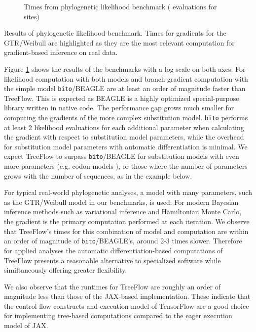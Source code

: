 \begin{figure}
    \centering
    \caption{Times from phylogenetic likelihood benchmark ( evaluations for  sites)}
    \label{fig:benchmark}
\end{figure}

\begin{table}
    \centering
    \caption{Results of phylogenetic likelihood benchmark. Times for gradients for the GTR/Weibull are highlighted as they are the most relevant computation for gradient-based inference on real data.}
    \label{tab:benchmarkfit}
\end{table}

Figure \ref{fig:benchmark} shows the results of the benchmarks with a log scale on both axes. For likelihood computation with both models and branch gradient computation with the simple model \texttt{bito}/BEAGLE are at least an order of magnitude faster than TreeFlow. This is expected as BEAGLE is a highly optimized special-purpose library written in native code. The performance gap grows much smaller for computing the gradients of the more complex substitution model. \texttt{bito} performs at least 2 likelihood evaluations for each additional parameter when calculating the gradient with respect to substitution model parameters, while the overhead for substitution model parameters with automatic differentiation is minimal. We expect TreeFlow to surpass \texttt{bito}/BEAGLE for substitution models with even more parameters (e.g. codon models \cite{goldman1994codon}), or those where the number of parameters grows with the number of sequences, as in the example below.

For typical real-world phylogenetic analyses, a model with many parameters, such as the GTR/Weibull model in our benchmarks, is used. For modern Bayesian inference methods such as variational inference and Hamiltonian Monte Carlo, the gradient is the primary computation performed at each iteration. We observe that TreeFlow's times for this combination of model and computation are within an order of magnitude of \texttt{bito}/BEAGLE's, around 2-3 times slower. Therefore for applied analyses the automatic differentiation-based computations of TreeFlow presents a reasonable alternative to specialized software while similtaneously offering greater flexibility.

We also observe that the runtimes for TreeFlow are roughly an order of magnitude less than those of the JAX-based implementation. These indicate that the control flow constructs and execution model of TensorFlow are a good choice for implementing tree-based computations compared to the eager execution model of JAX.

